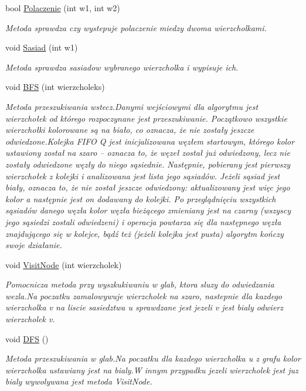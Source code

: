 \begin{DoxyCompactItemize}
bool \hyperlink{class_graf_aa153595415bd8bec9bc26bd8fb521492}{Polaczenie} (int w1, int w2)
\begin{DoxyCompactList}\small\item\em Metoda sprawdza czy wystepuje polaczenie miedzy dwoma wierzcholkami. \end{DoxyCompactList}\item 
void \hyperlink{class_graf_a5c5e84172e32e1e0564c931fcb3f7088}{Sasiad} (int w1)
\begin{DoxyCompactList}\small\item\em Metoda sprawdza sasiadow wybranego wierzcholka i wypisuje ich. \end{DoxyCompactList}\item 
void \hyperlink{class_graf_a48ef7dc699b09162388314e67cc6e150}{B\-F\-S} (int wierzcholeks)
\begin{DoxyCompactList}\small\item\em Metoda przeszukiwania wstecz.\-Danymi wejściowymi dla algorytmu jest wierzchołek od którego rozpoczynane jest przeszukiwanie. Początkowo wszystkie wierzchołki kolorowane są na biało, co oznacza, że nie zostały jeszcze odwiedzone.\-Kolejka F\-I\-F\-O Q jest inicjalizowana węzłem startowym, którego kolor ustawiony został na szaro – oznacza to, że węzeł został już odwiedzony, lecz nie zostały odwiedzone węzły do niego sąsiednie. Następnie, pobierany jest pierwszy wierzchołek z kolejki i analizowana jest lista jego sąsiadów. Jeżeli sąsiad jest biały, oznacza to, że nie został jeszcze odwiedzony\-: aktualizowany jest więc jego kolor a następnie jest on dodawany do kolejki. Po przeglądnięciu wszystkich sąsiadów danego węzła kolor węzła bieżącego zmieniany jest na czarny (wszyscy jego sąsiedzi zostali odwiedzeni) i operacja powtarza się dla następnego węzła znajdującego się w kolejce, bądź też (jeżeli kolejka jest pusta) algorytm kończy swoje działanie. \end{DoxyCompactList}\item 
void \hyperlink{class_graf_a8340cd1321426d1a49b5e50f1c7e10f1}{Visit\-Node} (int wierzcholek)
\begin{DoxyCompactList}\small\item\em Pomocnicza metoda przy wyszkukiwaniu w glab, ktora sluzy do odwiedzania wezla.\-Na poczatku zamalowywuje wierzcholek na szaro, nastepnie dla kazdego wierzcholka v na liscie sasiedztwa u sprawdzane jest jezeli v jest bialy odwierz wierzcholek v. \end{DoxyCompactList}\item 
void \hyperlink{class_graf_a8b40e6700dd8f1f71b6b47558c0975a1}{D\-F\-S} ()
\begin{DoxyCompactList}\small\item\em Metoda przeszukiwania w glab.\-Na poczatku dla kazdego wierzcholka u z grafu kolor wierzcholka ustawiany jest na bialy.\-W innym przypadku jezeli wierzcholek jest juz bialy wywolywana jest metoda Visit\-Node. \end{DoxyCompactList}\end{DoxyCompactItemize}
